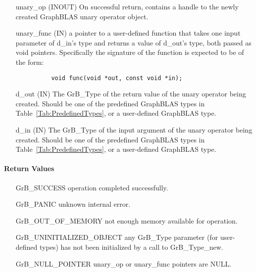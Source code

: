 \begin{itemize}[leftmargin=1.1in]
    \item[{\sf unary\_op}] ({\sf INOUT}) On successful return, contains a
                           handle to the newly created GraphBLAS unary operator object.
    \item[{\sf unary\_func}] ({\sf IN})  a pointer to a user-defined function that takes 
                           one input parameter of {\sf d\_in}'s type
			   and returns a value of {\sf d\_out}'s type, both passed as {\sf void} pointers.
                           Specifically the signature of the function is expected to 
                           be of the form:
          \begin{verbatim}
          void func(void *out, const void *in);
          \end{verbatim}
    \item[{\sf d\_out}] ({\sf IN})  The {\sf GrB\_Type} of the return value of the unary 
                           operator being created.  Should be one of the predefined 
                           GraphBLAS types in Table~\ref{Tab:PredefinedTypes}, or a 
                           user-defined GraphBLAS type.
    \item[{\sf d\_in}] ({\sf IN})  The {\sf GrB\_Type} of the input 
                           argument of the unary operator being created.  Should be 
                           one of the predefined GraphBLAS types in 
                           Table~\ref{Tab:PredefinedTypes}, or a user-defined GraphBLAS type.
\end{itemize}

\paragraph{Return Values}

\begin{itemize}[leftmargin=2.1in]
\item[{\sf GrB\_SUCCESS}]           operation completed successfully.
\item[{\sf GrB\_PANIC}]             unknown internal error.
\item[{\sf GrB\_OUT\_OF\_MEMORY}]          not enough memory available for operation.
\item[{\sf GrB\_UNINITIALIZED\_OBJECT}]          any {\sf GrB\_Type} parameter (for
                                    user-defined types) has not been
                                    initialized by a call to {\sf GrB\_Type\_new}.
\item[{\sf GrB\_NULL\_POINTER}]    {\sf unary\_op} or {\sf unary\_func}
                                    pointers are {\sf NULL}.

\end{itemize}

